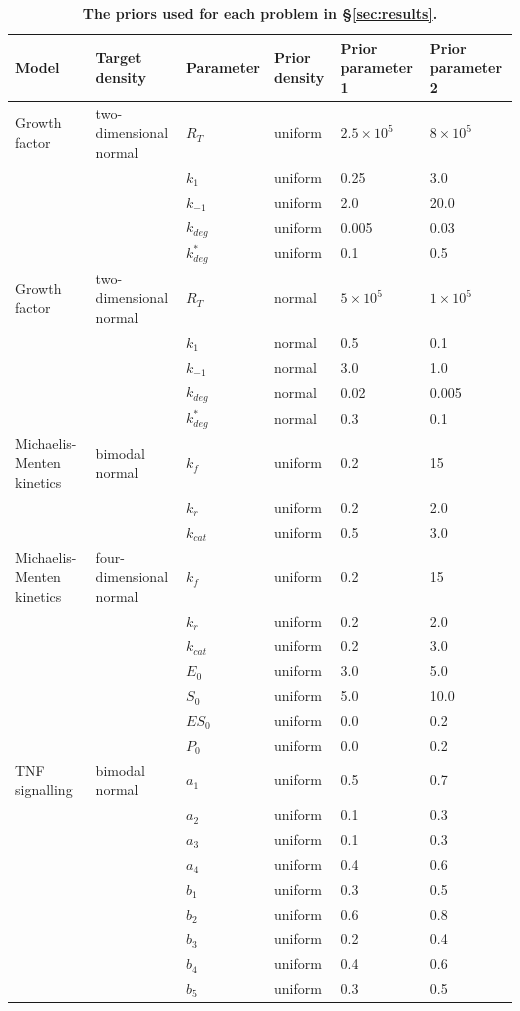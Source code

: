 \documentclass[10pt,letterpaper]{article}
\begin{document}
\begin{table}[htbp]
	\centering
	\scriptsize
	\begin{adjustwidth}{-1.0in}{-0.1in}%
		\begin{tabularx}{1.4\textwidth}{llllll}
			Model	& Target density & Parameter & Prior density & Prior parameter 1 & Prior parameter 2\\
			\toprule
			Growth factor & two-dimensional normal & $R_T$ & uniform & $2.5 \times 10^5$ &  $8 \times 10^5$\\
			&& $k_1$ & uniform & 0.25 & 3.0\\
			&& $k_{-1}$ & uniform & 2.0 & 20.0\\
			&& $k_{deg}$ & uniform & 0.005 & 0.03\\
			&& $k^*_{deg}$ & uniform & 0.1 & 0.5\\
			\toprule
			Growth factor & two-dimensional normal & $R_T$ & normal & $5 \times 10^5$ &  $1 \times 10^5$\\
			&& $k_1$ & normal & 0.5 & 0.1\\
			&& $k_{-1}$ & normal & 3.0 & 1.0\\
			&& $k_{deg}$ & normal & 0.02 & 0.005\\
			&& $k^*_{deg}$ & normal & 0.3 & 0.1\\
			\toprule
			Michaelis-Menten kinetics & bimodal normal & $k_f$ & uniform & 0.2 &  15\\
			&& $k_r$ & uniform & 0.2 & 2.0\\
			&& $k_{cat}$ & uniform & 0.5 & 3.0\\
			\toprule
			Michaelis-Menten kinetics & four-dimensional normal & $k_f$ & uniform & 0.2 &  15\\
			&& $k_r$ & uniform & 0.2 & 2.0\\
			&& $k_{cat}$ & uniform & 0.2 & 3.0\\
			&& $E_0$ & uniform & 3.0 & 5.0\\
			&& $S_0$ & uniform & 5.0 & 10.0\\
			&& $ES_0$ & uniform & 0.0 & 0.2\\
			&& $P_0$ & uniform & 0.0 & 0.2\\
			\toprule
			TNF signalling & bimodal normal & $a_1$ & uniform & 0.5 & 0.7\\
			&& $a_2$ & uniform & 0.1 & 0.3\\
			&& $a_3$ & uniform & 0.1 & 0.3\\
			&& $a_4$ & uniform & 0.4 & 0.6\\
			&& $b_1$ & uniform & 0.3 & 0.5\\
			&& $b_2$ & uniform & 0.6 & 0.8\\
			&& $b_3$ & uniform & 0.2 & 0.4\\
			&& $b_4$ & uniform & 0.4 & 0.6\\
			&& $b_5$ & uniform & 0.3 & 0.5\\
		\end{tabularx}
	\caption{\textbf{The priors used for each problem in \S\ref{sec:results}.}}
	\label{tab:priors}
	\end{adjustwidth}
\end{table}
\end{document}
